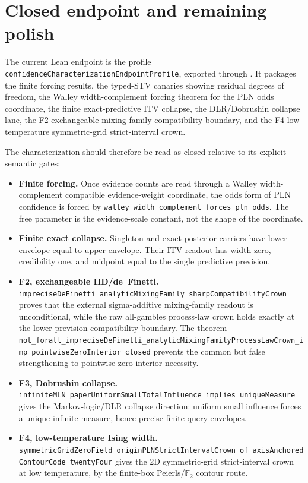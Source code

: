 \documentclass[]{article}
\newcommand{\codepath}[1]{\path{#1}}
\newcommand{\lid}[1]{{\ttfamily\nolinkurl{#1}}}
\begin{document}
\section{Closed endpoint and remaining polish}\label{sec:open}

The current Lean endpoint is the profile
\lid{confidenceCharacterizationEndpointProfile}, exported through
\codepath{Mettapedia.PLN.Core.PLNCanonicalAPI}. It packages the finite forcing
results, the typed-STV canaries showing residual degrees of freedom, the
Walley width-complement forcing theorem for the PLN odds coordinate, the
finite exact-predictive ITV collapse, the DLR/Dobrushin collapse lane, the
F2 exchangeable mixing-family compatibility boundary, and the F4
low-temperature symmetric-grid strict-interval crown.

The characterization should therefore be read as closed relative to its
explicit semantic gates:
\begin{itemize}
\item \textbf{Finite forcing.}
      Once evidence counts are read through a Walley width-complement
      compatible evidence-weight coordinate, the odds form of PLN
      confidence is forced by
      \lid{walley\_width\_complement\_forces\_pln\_odds}. The free
      parameter is the evidence-scale constant, not the shape of the
      coordinate.

\item \textbf{Finite exact collapse.}
      Singleton and exact posterior carriers have lower envelope equal to
      upper envelope. Their ITV readout has width zero, credibility one,
      and midpoint equal to the single predictive prevision.

\item \textbf{F2, exchangeable IID/de~Finetti.}
      \lid{impreciseDeFinetti\_analyticMixingFamily\_sharpCompatibilityCrown}
      proves that the external sigma-additive mixing-family readout is
      unconditional, while the raw all-gambles process-law crown holds
      exactly at the lower-prevision compatibility boundary. The theorem
      \lid{not\_forall\_impreciseDeFinetti\_analyticMixingFamilyProcessLawCrown\_imp\_pointwiseZeroInterior\_closed}
      prevents the common but false strengthening to pointwise zero-interior
      necessity.

\item \textbf{F3, Dobrushin collapse.}
      \lid{infiniteMLN\_paperUniformSmallTotalInfluence\_implies\_uniqueMeasure}
      gives the Markov-logic/DLR collapse direction: uniform small influence
      forces a unique infinite measure, hence precise finite-query envelopes.

\item \textbf{F4, low-temperature Ising width.}
      \lid{symmetricGridZeroField\_originPLNStrictIntervalCrown\_of\_axisAnchoredContourCode\_twentyFour}
      gives the 2D symmetric-grid strict-interval crown at low temperature,
      by the finite-box Peierls/$\mathbb{F}_2$ contour route.
\end{itemize}
\end{document}
